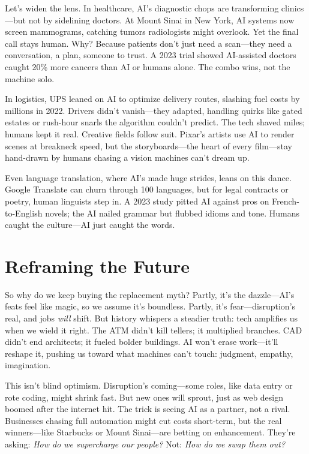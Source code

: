 \documentclass[
  Letterpaper,
]{scrbook}
\begin{document}
Let's widen the lens. In healthcare, AI's diagnostic
chops are transforming clinics---but not by sidelining doctors. At Mount
Sinai in New York, AI systems now screen mammograms, catching tumors
radiologists might overlook. Yet the final call stays human. Why?
Because patients don't just need a scan---they need a conversation, a
plan, someone to trust. A 2023 trial showed AI-assisted doctors caught
20\% more cancers than AI or humans alone. The combo wins, not the
machine solo.

In logistics, UPS leaned on AI to optimize delivery routes, slashing
fuel costs by millions in 2022. Drivers didn't vanish---they adapted,
handling quirks like gated estates or rush-hour snarls the algorithm
couldn't predict. The tech shaved miles; humans kept it real. Creative
fields follow suit. Pixar's artists use AI to
render scenes at breakneck speed, but the storyboards---the heart of
every film---stay hand-drawn by humans chasing a vision machines can't
dream up.

Even language translation, where AI's made huge strides, leans on this
dance. Google Translate can churn through 100
languages, but for legal contracts or poetry, human linguists step in. A
2023 study pitted AI against pros on French-to-English novels; the AI
nailed grammar but flubbed idioms and tone. Humans caught the
culture---AI just caught the words.

\section{Reframing the Future}\label{reframing-the-future}

So why do we keep buying the replacement myth? Partly, it's the
dazzle---AI's feats feel like magic, so we assume it's boundless.
Partly, it's fear---disruption's real, and jobs \emph{will} shift. But
history whispers a steadier truth: tech amplifies us when we wield it
right. The ATM didn't kill tellers; it multiplied branches. CAD didn't
end architects; it fueled bolder buildings. AI won't erase work---it'll
reshape it, pushing us toward what machines can't touch: judgment,
empathy, imagination.

This isn't blind optimism. Disruption's coming---some roles, like data
entry or rote coding, might shrink fast. But new ones will sprout, just
as web design boomed after the internet hit. The trick is seeing AI as a
partner, not a rival. Businesses chasing full automation might cut costs
short-term, but the real winners---like Starbucks or Mount Sinai---are
betting on enhancement. They're asking: \emph{How do we supercharge our
people?} Not: \emph{How do we swap them out?}
\end{document}
